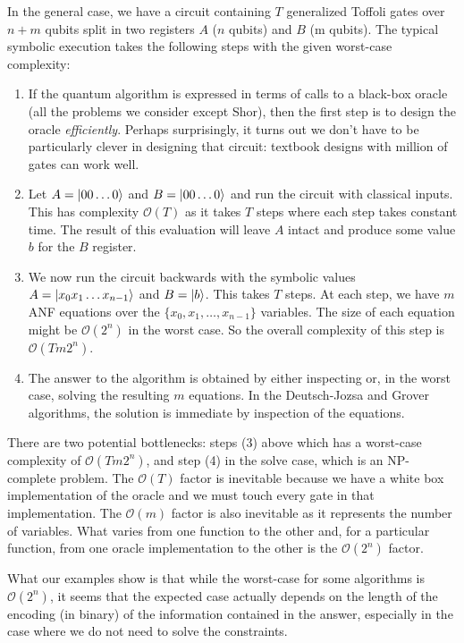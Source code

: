 \documentclass[sigplan,screen]{acmart}
\theoremstyle{definition}
\begin{document}
In the general case, we have a circuit containing $T$ generalized
Toffoli gates over $n+m$ qubits split in two registers $A$ ($n$
qubits) and $B$ (m qubits). The typical symbolic execution takes the
following steps with the given worst-case complexity:

\begin{enumerate}
\item If the quantum algorithm is expressed in terms of calls to a
  black-box oracle (all the problems we consider except Shor), then
  the first step is to design the oracle \emph{efficiently}. Perhaps
  surprisingly, it turns out we don’t have to be particularly clever
  in designing that circuit: textbook designs with million of gates
  can work well.
  \item Let $A = \ket{00\ldots 0}$ and $B = \ket{00\ldots 0}$ and run the
circuit with classical inputs. This has complexity $\mathcal{O}(T)$ as
it takes $T$ steps where each step takes constant time. The result of
this evaluation will leave $A$ intact and produce some value $b$ for
the $B$ register.
\item We now run the circuit backwards with the symbolic
values $A = \ket{x_0 x_1 \ldots x_{n-1}}$ and $B = \ket{b}$. This
takes $T$ steps. At each step, we have $m$ ANF equations over the
$\{x_0,x_1,\ldots,x_{n-1}\}$ variables. The size of each equation
  might be $\mathcal{O}(2^n)$ in the worst case. So the overall
  complexity of this step is $\mathcal{O}(Tm 2^n)$.
\item The answer to the algorithm is obtained by
  either inspecting or, in the worst case, solving
  the resulting $m$ equations. In the Deutsch-Jozsa and Grover
  algorithms, the solution is immediate by inspection of the
  equations.
\end{enumerate}
There are two potential bottlenecks: steps (3) above which has a
worst-case complexity of $\mathcal{O}(Tm 2^n)$, and step (4)
in the solve case, which is an NP-complete problem. The $\mathcal{O}(T)$
factor is inevitable because we have a white box implementation of the
oracle and we must touch every gate in that implementation. The
$\mathcal{O}(m)$ factor is also inevitable as it represents the number
of variables. What varies from one function to the other and, for a
particular function, from one oracle implementation to the other is
the $\mathcal{O}(2^n)$ factor.

What our examples show is that while the worst-case for some
algorithms is $\mathcal{O}(2^n)$,
it seems that the expected case actually depends on the length of the
encoding (in binary) of the information contained in the answer, especially
in the case where we do not need to solve the constraints.
\end{document}
